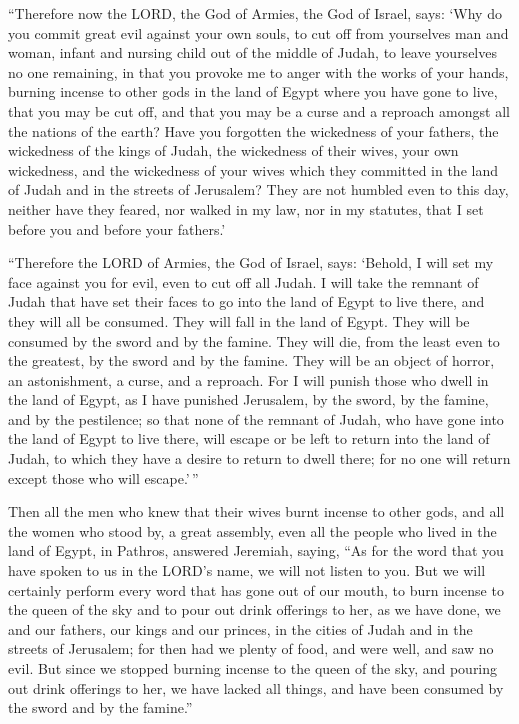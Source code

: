  ``Therefore now the LORD, the God of Armies, the God of
Israel, says: `Why do you commit great evil against your own souls, to
cut off from yourselves man and woman, infant and nursing child out of
the middle of Judah, to leave yourselves no one remaining, 
in that you provoke me to anger with the works of your hands, burning
incense to other gods in the land of Egypt where you have gone to live,
that you may be cut off, and that you may be a curse and a reproach
amongst all the nations of the earth?  Have you forgotten
the wickedness of your fathers, the wickedness of the kings of Judah,
the wickedness of their wives, your own wickedness, and the wickedness
of your wives which they committed in the land of Judah and in the
streets of Jerusalem?  They are not humbled even to this
day, neither have they feared, nor walked in my law, nor in my statutes,
that I set before you and before your fathers.'

 ``Therefore the LORD of Armies, the God of Israel, says:
`Behold, I will set my face against you for evil, even to cut off all
Judah.  I will take the remnant of Judah that have set
their faces to go into the land of Egypt to live there, and they will
all be consumed. They will fall in the land of Egypt. They will be
consumed by the sword and by the famine. They will die, from the least
even to the greatest, by the sword and by the famine. They will be an
object of horror, an astonishment, a curse, and a reproach.
 For I will punish those who dwell in the land of Egypt, as
I have punished Jerusalem, by the sword, by the famine, and by the
pestilence;  so that none of the remnant of Judah, who have
gone into the land of Egypt to live there, will escape or be left to
return into the land of Judah, to which they have a desire to return to
dwell there; for no one will return except those who will escape.'\,''

 Then all the men who knew that their wives burnt incense
to other gods, and all the women who stood by, a great assembly, even
all the people who lived in the land of Egypt, in Pathros, answered
Jeremiah, saying,  ``As for the word that you have spoken
to us in the LORD's name, we will not listen to you.  But
we will certainly perform every word that has gone out of our mouth, to
burn incense to the queen of the sky and to pour out drink offerings to
her, as we have done, we and our fathers, our kings and our princes, in
the cities of Judah and in the streets of Jerusalem; for then had we
plenty of food, and were well, and saw no evil.  But since
we stopped burning incense to the queen of the sky, and pouring out
drink offerings to her, we have lacked all things, and have been
consumed by the sword and by the famine.''

